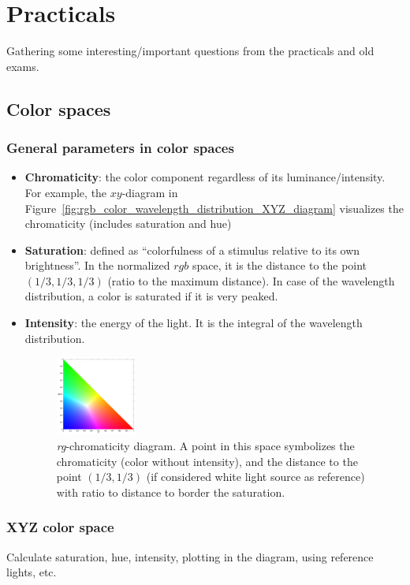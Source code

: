 \section{Practicals}
Gathering some interesting/important questions from the practicals and old exams.
\subsection{Color spaces}
\subsubsection{General parameters in color spaces}
\begin{itemize}
	\item \textbf{Chromaticity}: the color component regardless of its luminance/intensity. For example, the $xy$-diagram in Figure~\ref{fig:rgb_color_wavelength_distribution_XYZ_diagram} visualizes the chromaticity (includes saturation and hue)
	\item \textbf{Saturation}: defined as ``colorfulness of a stimulus relative to its own brightness''. In the normalized $rgb$ space, it is the distance to the point $(1/3,1/3,1/3)$ (ratio to the maximum distance). In case of the wavelength distribution, a color is saturated if it is very peaked.
	\item \textbf{Intensity}: the energy of the light. It is the integral of the wavelength distribution.
	\begin{figure}[ht!]
		\centering
		\includegraphics[width=0.25\textwidth]{figures/cv_image_formation_rg_chromaticity.png}
		\caption{\textit{rg}-chromaticity diagram. A point in this space symbolizes the chromaticity (color without intensity), and the distance to the point $(1/3,1/3)$ (if considered white light source as reference) with ratio to distance to border the saturation.}
	\end{figure}
\end{itemize}
\subsubsection{XYZ color space}
Calculate saturation, hue, intensity, plotting in the diagram, using reference lights, etc.

